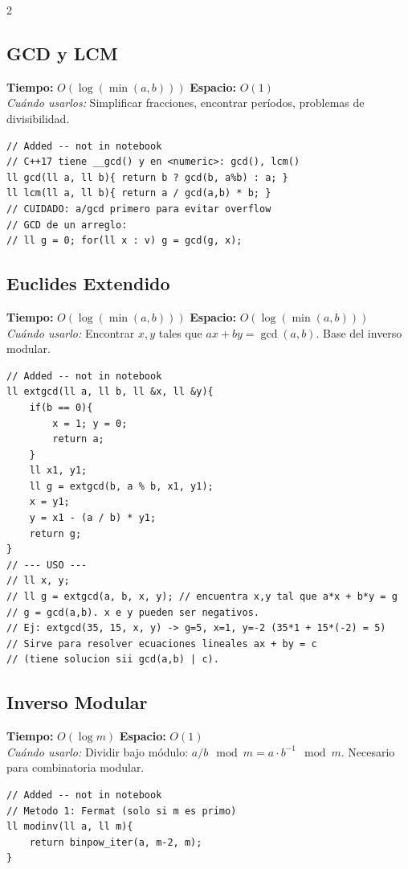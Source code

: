 \documentclass[10pt,a4paper]{article}
\begin{document}
\begin{multicols}{2}
\subsection{GCD y LCM}
\textbf{Tiempo:} $O(\log(\min(a,b)))$ \quad \textbf{Espacio:} $O(1)$\\
\textit{Cu\'ando usarlos:} Simplificar fracciones, encontrar per\'iodos, problemas de divisibilidad.

\begin{lstlisting}
// Added -- not in notebook
// C++17 tiene __gcd() y en <numeric>: gcd(), lcm()
ll gcd(ll a, ll b){ return b ? gcd(b, a%b) : a; }
ll lcm(ll a, ll b){ return a / gcd(a,b) * b; }
// CUIDADO: a/gcd primero para evitar overflow
// GCD de un arreglo:
// ll g = 0; for(ll x : v) g = gcd(g, x);
\end{lstlisting}

\subsection{Euclides Extendido}
\textbf{Tiempo:} $O(\log(\min(a,b)))$ \quad \textbf{Espacio:} $O(\log(\min(a,b)))$\\
\textit{Cu\'ando usarlo:} Encontrar $x, y$ tales que $ax + by = \gcd(a,b)$. Base del inverso modular.

\begin{lstlisting}
// Added -- not in notebook
ll extgcd(ll a, ll b, ll &x, ll &y){
    if(b == 0){
        x = 1; y = 0;
        return a;
    }
    ll x1, y1;
    ll g = extgcd(b, a % b, x1, y1);
    x = y1;
    y = x1 - (a / b) * y1;
    return g;
}
// --- USO ---
// ll x, y;
// ll g = extgcd(a, b, x, y); // encuentra x,y tal que a*x + b*y = g
// g = gcd(a,b). x e y pueden ser negativos.
// Ej: extgcd(35, 15, x, y) -> g=5, x=1, y=-2 (35*1 + 15*(-2) = 5)
// Sirve para resolver ecuaciones lineales ax + by = c
// (tiene solucion sii gcd(a,b) | c).
\end{lstlisting}

\subsection{Inverso Modular}
\textbf{Tiempo:} $O(\log m)$ \quad \textbf{Espacio:} $O(1)$\\
\textit{Cu\'ando usarlo:} Dividir bajo m\'odulo: $a/b \mod m = a \cdot b^{-1} \mod m$. Necesario para combinatoria modular.

\begin{lstlisting}
// Added -- not in notebook
// Metodo 1: Fermat (solo si m es primo)
ll modinv(ll a, ll m){
    return binpow_iter(a, m-2, m);
}


\end{lstlisting}
\end{multicols}
\end{document}
